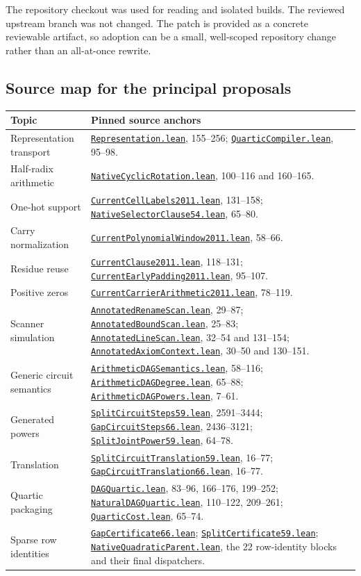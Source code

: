 \documentclass[11pt,letterpaper]{article}
\newcommand{\SourceBase}{https://github.com/VladimirReshetnikov/ProveIt/blob/60e9c5d620c6c387d932876cfa2d9376f64ea56c/Computability/DiophantineConsistency}
\newcommand{\module}[1]{\href{\SourceBase/Lean/DiophantineConsistency/#1.lean}{\texttt{#1.lean}}}
\begin{document}
The repository checkout was used for reading and isolated builds. The reviewed upstream branch was not changed. The patch is provided as a concrete reviewable artifact, so adoption can be a small, well-scoped repository change rather than an all-at-once rewrite.

\subsection{Source map for the principal proposals}

\begin{longtable}{L{0.26\textwidth}L{0.63\textwidth}}
\toprule
Topic & Pinned source anchors\\
\midrule
\endhead
Representation transport & \module{Representation}, 155--256; \module{QuarticCompiler}, 95--98.\\
Half-radix arithmetic & \module{NativeCyclicRotation}, 100--116 and 160--165.\\
One-hot support & \module{CurrentCellLabels2011}, 131--158; \module{NativeSelectorClause54}, 65--80.\\
Carry normalization & \module{CurrentPolynomialWindow2011}, 58--66.\\
Residue reuse & \module{CurrentClause2011}, 118--131; \module{CurrentEarlyPadding2011}, 95--107.\\
Positive zeros & \module{CurrentCarrierArithmetic2011}, 78--119.\\
Scanner simulation & \module{AnnotatedRenameScan}, 29--87; \module{AnnotatedBoundScan}, 25--83; \module{AnnotatedLineScan}, 32--54 and 131--154; \module{AnnotatedAxiomContext}, 30--50 and 130--151.\\
Generic circuit semantics & \module{ArithmeticDAGSemantics}, 58--116; \module{ArithmeticDAGDegree}, 65--88; \module{ArithmeticDAGPowers}, 7--61.\\
Generated powers & \module{SplitCircuitSteps59}, 2591--3444; \module{GapCircuitSteps66}, 2436--3121; \module{SplitJointPower59}, 64--78.\\
Translation & \module{SplitCircuitTranslation59}, 16--77; \module{GapCircuitTranslation66}, 16--77.\\
Quartic packaging & \module{DAGQuartic}, 83--96, 166--176, 199--252; \module{NaturalDAGQuartic}, 110--122, 209--261; \module{QuarticCost}, 65--74.\\
Sparse row identities & \module{GapCertificate66}; \module{SplitCertificate59}; \module{NativeQuadraticParent}, the 22 row-identity blocks and their final dispatchers.\\

\end{longtable}
\end{document}
